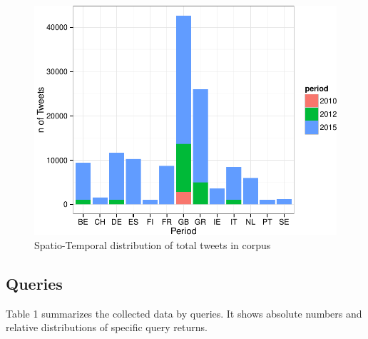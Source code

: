 \documentclass[]{article}
\begin{document}
\begin{figure}

{\centering \includegraphics{fin_paper_files/figure-latex/unnamed-chunk-5-1} 

}

\caption{Spatio-Temporal distribution of total tweets in corpus}\label{fig:unnamed-chunk-5}
\end{figure}

\subsection{Queries}\label{queries}

Table 1 summarizes the collected data by queries. It shows absolute
numbers and relative distributions of specific query returns.
\end{document}

